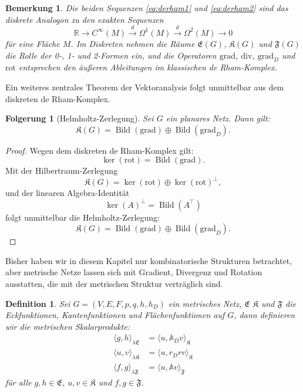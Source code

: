 \documentclass[11pt,a4paper,leqno]{report}
\newtheorem{definition}[theorem]{Definition}
\newtheorem{corollary}[theorem]{Folgerung}
\newtheorem{remark}[theorem]{Bemerkung}
\numberwithin{equation}{chapter}
\begin{document}
\begin{remark}
	Die beiden Sequenzen \eqref{eq:derham1} und \eqref{eq:derham2} 
	sind das diskrete Analogon zu den exakten Sequenzen
	\[
	\mathbb{R}\to C^\infty(M)\xrightarrow{d}\Omega^1(M)\xrightarrow{d}\Omega^2(M)\to 0
	\]
	für eine Fläche $M$.  
	Im Diskreten nehmen die Räume $\mathfrak{E}(G)$, $\mathfrak{K}(G)$ und $\mathfrak{F}(G)$ 
	die Rolle der 0‑, 1‑ und 2‑Formen ein, und die Operatoren 
	$\mathrm{grad}$, $\mathrm{div}$, $\mathrm{grad}_D$ und $\mathrm{rot}$ 
	entsprechen den äußeren Ableitungen im klassischen de Rham-Komplex.
\end{remark}
\noindent
Ein weiteres zentrales Theorem der Vektoranalysis folgt unmittelbar aus dem diskreten de Rham-Komplex.
\begin{corollary}[Helmholtz-Zerlegung]\label{eq:helmoltz}
	Sei \(G\) ein planares Netz. Dann gilt:
	\[
	\mathfrak{K}(G) =  \operatorname{Bild}(\mathrm{grad}) \oplus  \operatorname{Bild}(\mathrm{grad}_D).
	\]
\end{corollary}
\begin{proof}
	Wegen dem diskreten de Rham-Komplex gilt:
	\[
	\ker(\mathrm{rot}) =  \operatorname{Bild}(\mathrm{grad}).
	\]
	Mit der Hilbertraum-Zerlegung
	\[
	\mathfrak{K}(G) = \ker(\mathrm{rot}) \oplus \ker(\mathrm{rot})^\perp,
	\]
	und der linearen Algebra-Identität
	\[
	\ker(A)^\perp =  \operatorname{Bild}(A^\top)
	\]
	folgt unmittelbar die Helmholtz-Zerlegung:
	\[
	\mathfrak{K}(G) =  \operatorname{Bild}(\mathrm{grad}) \oplus  \operatorname{Bild}(\mathrm{grad}_D).
	\]
\end{proof}
\noindent
Bisher haben wir in diesem Kapitel nur kombinatorische Strukturen betrachtet, aber metrische Netze lassen sich mit Gradient, Divergenz und Rotation ausstatten, die mit der metrischen Struktur verträglich sind. 
\begin{definition}
	Sei $G=(V,E,F,p,q,h,h_D)$ ein metrisches Netz, $\mathfrak{E}$ $\mathfrak{K}$ und $\mathfrak{F}$ die Eckfunktionen, Kantenfunktionen und Flächenfunktionen auf $G$, dann definieren wir die metrischen Skalarprodukte:
	\begin{align}
		\langle g, h \rangle_{\lambda\mathfrak{E}} &= \langle u, \mathbb{A}_Dv \rangle_{\mathfrak{K}}\\
		\langle u, v \rangle_{\lambda\mathfrak{K}} &= \langle u, r_D rv \rangle_{\mathfrak{K}}\\
		\langle f, g \rangle_{\lambda\mathfrak{F}} &= \langle u, \mathbb{A}v \rangle_{\mathfrak{F}}
	\end{align}
	für alle $g,h\in\mathfrak{E}$, $u,v\in\mathfrak{K}$ und $f,g\in\mathfrak{F}$.
\end{definition}
\end{document}
